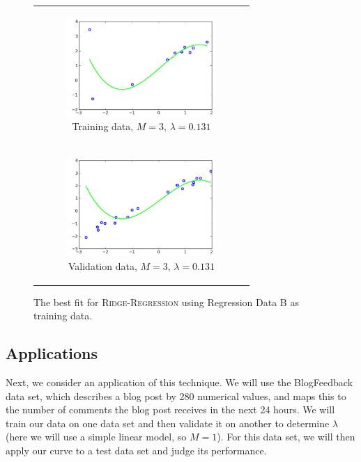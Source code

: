 \documentclass{sigchi}
\begin{document}
\begin{figure}[!t]
\centering
\begin{tabular}{c}

\begin{subfigure}[b]{2.25in}
	\includegraphics[width = 2.25in]{B-3.png}
	\caption{Training data, $M = 3$, $\lambda = 0.131$}
\end{subfigure} \\

\begin{subfigure}[b]{2.25in}
	\includegraphics[width = 2.25in]{BV-3.png}
	\caption{Validation data, $M = 3$, $\lambda = 0.131$}
\end{subfigure} \\

\end{tabular}

\caption{The best fit for \textsc{Ridge-Regression} using Regression Data B as training data.}
\end{figure}


\subsection{Applications}

Next, we consider an application of this technique. We will use the BlogFeedback data set, which describes a blog post by 280 numerical values, and maps this to the number of comments the blog post receives in the next 24 hours. We will train our data on one data set and then validate it on another to determine $\lambda$ (here we will use a simple linear model, so $M = 1$). For this data set, we will then apply our curve to a test data set and judge its performance.
\end{document}
